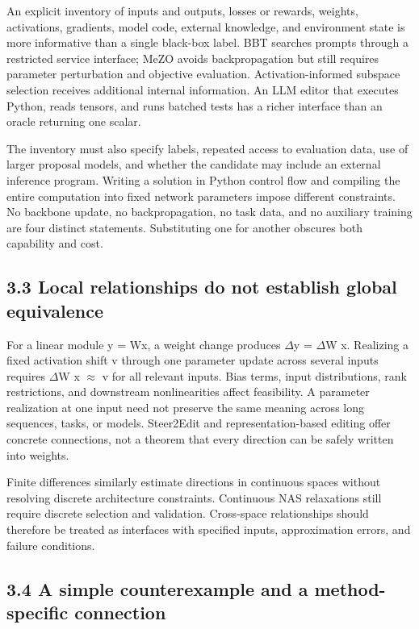 An explicit inventory of inputs and outputs, losses or rewards, weights, activations, gradients, model code, external knowledge, and environment state is more informative than a single black-box label. BBT searches prompts through a restricted service interface; MeZO avoids backpropagation but still requires parameter perturbation and objective evaluation.\cite{r52,r58} Activation-informed subspace selection receives additional internal information.\cite{r85} An LLM editor that executes Python, reads tensors, and runs batched tests has a richer interface than an oracle returning one scalar.\cite{r1}


The inventory must also specify labels, repeated access to evaluation data, use of larger proposal models, and whether the candidate may include an external inference program. Writing a solution in Python control flow and compiling the entire computation into fixed network parameters impose different constraints.\cite{r11,r50} No backbone update, no backpropagation, no task data, and no auxiliary training are four distinct statements. Substituting one for another obscures both capability and cost.


\subsection*{3.3 Local relationships do not establish global equivalence}

For a linear module y = Wx, a weight change produces \ensuremath{\Delta}y = \ensuremath{\Delta}W x. Realizing a fixed activation shift v through one parameter update across several inputs requires \ensuremath{\Delta}W x \ensuremath{\approx} v for all relevant inputs. Bias terms, input distributions, rank restrictions, and downstream nonlinearities affect feasibility. A parameter realization at one input need not preserve the same meaning across long sequences, tasks, or models. Steer2Edit and representation-based editing offer concrete connections, not a theorem that every direction can be safely written into weights.\cite{r38,r99,r120}


Finite differences similarly estimate directions in continuous spaces without resolving discrete architecture constraints. Continuous NAS relaxations still require discrete selection and validation.\cite{r75,r136,r156} Cross-space relationships should therefore be treated as interfaces with specified inputs, approximation errors, and failure conditions.


\subsection*{3.4 A simple counterexample and a method-specific connection}

